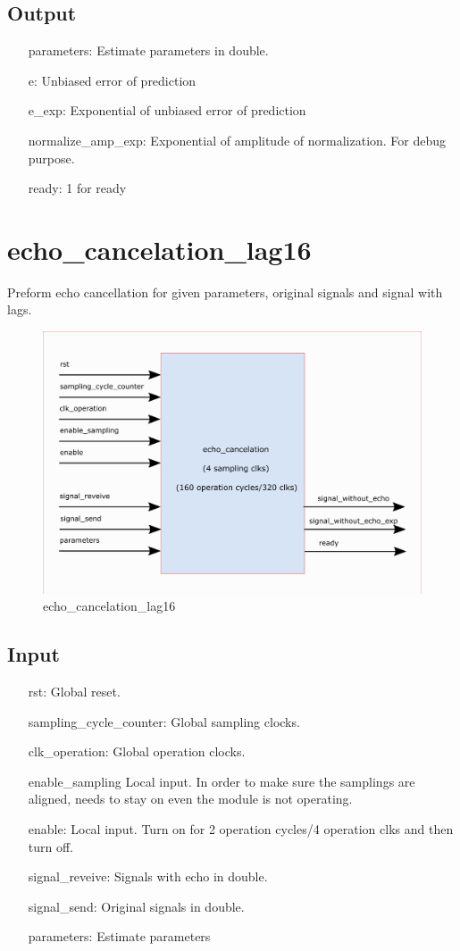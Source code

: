 \documentclass[twoside,a4paper]{refart}
\begin{document}
\subsection{Output}
\begin{itemize}
	\item[parameters:] Estimate parameters in double.
	\item[e:] Unbiased error of prediction
	\item[e\_exp:] Exponential of unbiased error of prediction
	\item[normalize\_amp\_exp:] Exponential of amplitude of normalization. For debug purpose.
	\item[ready:] 1 for ready
\end{itemize}

\section{echo\_cancelation\_lag16}
Preform echo cancellation for given parameters, original signals and signal with lags. 
\begin{figure}[H]
	\centering
	\includegraphics[scale=1.2]{echo_cancelation.png}
	\caption{echo\_cancelation\_lag16}
	\label{}
\end{figure}
\subsection{Input}
\begin{itemize}
	\item[rst:      ] Global reset.
	\item[sampling\_cycle\_counter:] Global sampling clocks.
	\item[clk\_operation:] Global operation clocks.
	\item[enable\_sampling] Local input. In order to make sure the samplings are aligned, needs to stay on even the module is not operating.
	\item[enable:] Local input. Turn on for 2 operation cycles/4 operation clks and then turn off.
	\item[signal\_reveive:] Signals with echo in double.
	\item[signal\_send:] Original signals in double.
	\item[parameters:] Estimate parameters
\end{itemize}
\end{document}
